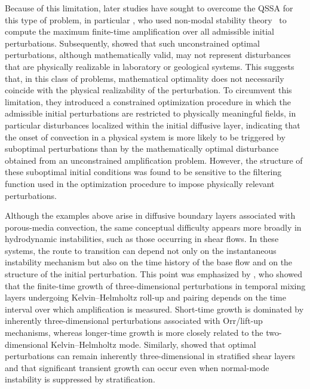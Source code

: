 Because of this limitation, later studies have sought to overcome the QSSA for this type of problem, in particular \citet{rapaka-et-al-2008}, who used non-modal stability theory~\citep{schmid-2007} to compute the maximum finite-time amplification over all admissible initial perturbations. Subsequently, \citet{don-nils-amir-2013} showed that such unconstrained optimal perturbations, although mathematically valid, may not represent disturbances that are physically realizable in laboratory or geological systems. This suggests that, in this class of problems, mathematical optimality does not necessarily coincide with the physical realizability of the perturbation. To circumvent this limitation, they introduced a constrained optimization procedure in which the admissible initial perturbations are restricted to physically meaningful fields, in particular disturbances localized within the initial diffusive layer, indicating that the onset of convection in a physical system is more likely to be triggered by suboptimal perturbations than by the mathematically optimal disturbance obtained from an unconstrained amplification problem. However, the structure of these suboptimal initial conditions was found to be sensitive to the filtering function used in the optimization procedure to impose physically relevant perturbations.

Although the examples above arise in diffusive boundary layers associated with porous-media convection, the same conceptual difficulty appears more broadly in hydrodynamic instabilities, such as those occurring in shear flows. In these systems, the route to transition can depend not only on the instantaneous instability mechanism but also on the time history of the base flow and on the structure of the initial perturbation. This point was emphasized by \citet{arratia-caulfield-chomaz-2013}, who showed that the finite-time growth of three-dimensional perturbations in temporal mixing layers undergoing Kelvin--Helmholtz roll-up and pairing depends on the time interval over which amplification is measured. Short-time growth is dominated by inherently three-dimensional perturbations associated with Orr/lift-up mechanisms, whereas longer-time growth is more closely related to the two-dimensional Kelvin--Helmholtz mode. Similarly, \citet{kaminski-caulfield-taylor-2014} showed that optimal perturbations can remain inherently three-dimensional in stratified shear layers and that significant transient growth can occur even when normal-mode instability is suppressed by stratification.

